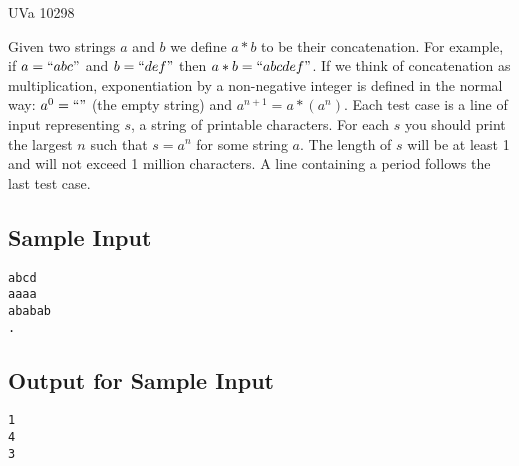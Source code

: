

\noindent
UVa 10298\bigskip

Given two strings $a$ and $b$ we define $a*b$ to be their concatenation. For example, if $a = ``abc"$ and $b = ``def"$ then $a*b = ``abcdef"$. If we think of concatenation as multiplication, exponentiation by a non-negative integer is defined in the normal way: $a^0 = ``"$ (the empty string) and $a^{n+1} = a*(a^n)$.
Each test case is a line of input representing $s$, a string of printable characters. For each $s$ you should print the largest $n$ such that $s = a^n$ for some string $a$. The length of $s$ will be at least 1 and will not exceed 1 million characters. A line containing a period follows the last test case.

\subsection*{Sample Input}

\begin{verbatim}
abcd
aaaa
ababab
.
\end{verbatim}

\subsection*{Output for Sample Input}

\begin{verbatim}
1
4
3
\end{verbatim}
